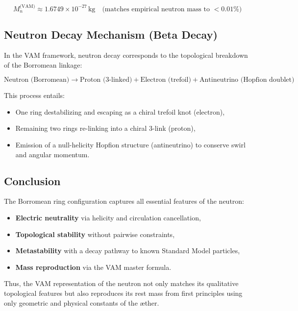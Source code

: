 \[
\boxed{
M_n^\text{(VAM)} \approx 1.6749 \times 10^{-27} \, \text{kg}
}
\quad \text{(matches empirical neutron mass to $< 0.01\%$)}
\]

\subsection{Neutron Decay Mechanism (Beta Decay)}

In the VAM framework, neutron decay corresponds to the topological breakdown of the Borromean linkage:

\[
\text{Neutron (Borromean)} \rightarrow \text{Proton (3-linked)} + \text{Electron (trefoil)} + \text{Antineutrino (Hopfion doublet)}
\]

This process entails:

\begin{itemize}
    \item One ring destabilizing and escaping as a chiral trefoil knot (electron),
    \item Remaining two rings re-linking into a chiral 3-link (proton),
    \item Emission of a null-helicity Hopfion structure (antineutrino) to conserve swirl and angular momentum.
\end{itemize}

\subsection{Conclusion}

The Borromean ring configuration captures all essential features of the neutron:

\begin{itemize}
    \item \textbf{Electric neutrality} via helicity and circulation cancellation,
    \item \textbf{Topological stability} without pairwise constraints,
    \item \textbf{Metastability} with a decay pathway to known Standard Model particles,
    \item \textbf{Mass reproduction} via the VAM master formula.
\end{itemize}

Thus, the VAM representation of the neutron not only matches its qualitative topological features but also reproduces its rest mass from first principles using only geometric and physical constants of the æther.
